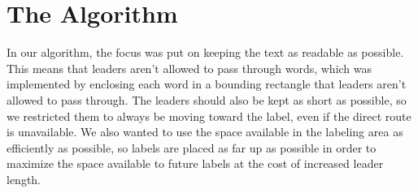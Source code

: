 \documentclass[11pt,a4paper]{vutinfth}
\begin{document}
\chapter{The Algorithm}

In our algorithm, the focus was put on keeping the text as readable as possible. This means that leaders aren't allowed to pass through words, which was implemented by enclosing each word in a bounding rectangle that leaders aren't allowed to pass through.
The leaders should also be kept as short as possible, so we restricted them to always be moving toward the label, even if the direct route is unavailable.%
We also wanted to use the space available in the labeling area as efficiently as possible, so labels are placed as far up as possible in order to maximize the space available to future labels at the cost of increased leader length.
\end{document}
